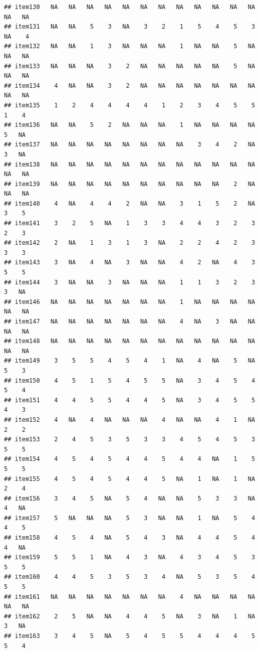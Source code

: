\documentclass[
  man]{apa6}
\begin{document}
\begin{verbatim}
## item130   NA   NA   NA   NA   NA   NA   NA   NA   NA   NA   NA   NA   NA   NA
## item131   NA   NA    5    3   NA    3    2    1    5    4    5    3   NA    4
## item132   NA   NA    1    3   NA   NA   NA    1   NA   NA    5   NA   NA   NA
## item133   NA   NA   NA    3    2   NA   NA   NA   NA   NA    5   NA   NA   NA
## item134    4   NA   NA    3    2   NA   NA   NA   NA   NA   NA   NA   NA   NA
## item135    1    2    4    4    4    4    1    2    3    4    5    5    1    4
## item136   NA   NA    5    2   NA   NA   NA    1   NA   NA   NA   NA    5   NA
## item137   NA   NA   NA   NA   NA   NA   NA   NA    3    4    2   NA    3   NA
## item138   NA   NA   NA   NA   NA   NA   NA   NA   NA   NA   NA   NA   NA   NA
## item139   NA   NA   NA   NA   NA   NA   NA   NA   NA   NA    2   NA   NA   NA
## item140    4   NA    4    4    2   NA   NA    3    1    5    2   NA    3    5
## item141    3    2    5   NA    1    3    3    4    4    3    2    3    2    3
## item142    2   NA    1    3    1    3   NA    2    2    4    2    3    3    3
## item143    3   NA    4   NA    3   NA   NA    4    2   NA    4    3    5    5
## item144    3   NA   NA    3   NA   NA   NA    1    1    3    2    3    3   NA
## item146   NA   NA   NA   NA   NA   NA   NA    1   NA   NA   NA   NA   NA   NA
## item147   NA   NA   NA   NA   NA   NA   NA    4   NA    3   NA   NA   NA   NA
## item148   NA   NA   NA   NA   NA   NA   NA   NA   NA   NA   NA   NA   NA   NA
## item149    3    5    5    4    5    4    1   NA    4   NA    5   NA    5    3
## item150    4    5    1    5    4    5    5   NA    3    4    5    4    5    4
## item151    4    4    5    5    4    4    5   NA    3    4    5    5    4    3
## item152    4   NA    4   NA   NA   NA    4   NA   NA    4    1   NA    2    2
## item153    2    4    5    3    5    3    3    4    5    4    5    3    5    5
## item154    4    5    4    5    4    4    5    4    4   NA    1    5    5    5
## item155    4    5    4    5    4    4    5   NA    1   NA    1   NA    2    4
## item156    3    4    5   NA    5    4   NA   NA    5    3    3   NA    4   NA
## item157    5   NA   NA   NA    5    3   NA   NA    1   NA    5    4    4    5
## item158    4    5    4   NA    5    4    3   NA    4    4    5    4    4   NA
## item159    5    5    1   NA    4    3   NA    4    3    4    5    3    5    5
## item160    4    4    5    3    5    3    4   NA    5    3    5    4    5    5
## item161   NA   NA   NA   NA   NA   NA   NA    4   NA   NA   NA   NA   NA   NA
## item162    2    5   NA   NA    4    4    5   NA    3   NA    1   NA    3   NA
## item163    3    4    5   NA    5    4    5    5    4    4    4    5    5    4

\end{verbatim}
\end{document}

